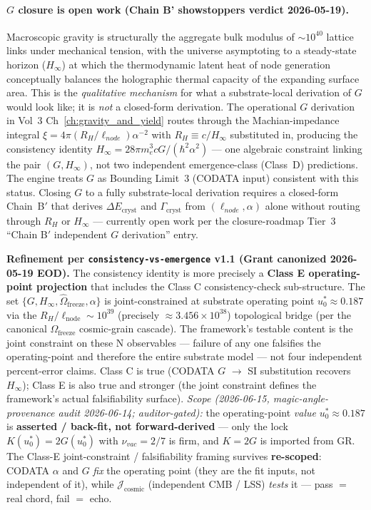 \paragraph{$G$ closure is open work (Chain B' showstoppers verdict 2026-05-19).}
Macroscopic gravity is structurally the aggregate bulk modulus of
$\sim\!10^{40}$ lattice links under mechanical tension, with the universe
asymptoting to a steady-state horizon ($H_\infty$) at which the thermodynamic
latent heat of node generation conceptually balances the holographic thermal
capacity of the expanding surface area. This is the \emph{qualitative
mechanism} for what a substrate-local derivation of $G$ would look like;
it is \emph{not} a closed-form derivation. The operational $G$ derivation
in Vol~3 Ch~\ref{ch:gravity_and_yield} routes through the Machian-impedance
integral $\xi = 4\pi(R_H/\ell_{node})\alpha^{-2}$ with
$R_H \equiv c/H_\infty$ substituted in, producing the consistency identity
$H_\infty = 28\pi m_e^3 cG/(\hbar^2\alpha^2)$ --- one algebraic constraint
linking the pair $(G, H_\infty)$, not two independent emergence-class
(Class~D) predictions. The engine treats $G$ as Bounding Limit~3 (CODATA input)
consistent with this status. Closing $G$ to a fully substrate-local
derivation requires a closed-form Chain~B$'$ that derives
$\Delta E_{\text{cryst}}$ and $\Gamma_{\text{cryst}}$ from
$(\ell_{node}, \alpha)$ alone without routing through $R_H$ or $H_\infty$ ---
currently open work per the closure-roadmap Tier~3 ``Chain B$'$ independent
$G$ derivation'' entry.

\medskip
\noindent\textbf{Refinement per \texttt{consistency-vs-emergence} v1.1 (Grant canonized 2026-05-19 EOD).} The consistency identity is more precisely a \textbf{Class E operating-point projection} that includes the Class C consistency-check sub-structure. The set $\{G, H_\infty, \hat{\Omega}_{\text{freeze}}, \alpha\}$ is joint-constrained at substrate operating point $u_0^* \approx 0.187$ via the $R_H/\ell_{\text{node}} \sim 10^{39}$ (precisely $\approx 3.456\times10^{38}$) topological bridge (per the canonical $\Omega_\text{freeze}$ cosmic-grain cascade). The framework's testable content is the joint constraint on these N observables --- failure of any one falsifies the operating-point and therefore the entire substrate model --- not four independent percent-error claims. Class C is true (CODATA $G$ $\to$ SI substitution recovers $H_\infty$); Class E is also true and stronger (the joint constraint defines the framework's actual falsifiability surface). \emph{Scope (2026-06-15, magic-angle-provenance audit 2026-06-14; auditor-gated):} the operating-point \emph{value} $u_0^* \approx 0.187$ is \textbf{asserted / back-fit, not forward-derived} --- only the lock $K(u_0^*) = 2G(u_0^*)$ with $\nu_{vac} = 2/7$ is firm, and $K = 2G$ is imported from GR. The Class-E joint-constraint / falsifiability framing survives \textbf{re-scoped}: CODATA $\alpha$ and $G$ \emph{fix} the operating point (they are the fit inputs, not independent of it), while $\mathcal{J}_{\text{cosmic}}$ (independent CMB / LSS) \emph{tests} it --- pass $=$ real chord, fail $=$ echo.

